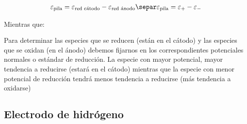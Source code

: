     \begin{gather*}
        \varepsilon_{\text{pila}} = \varepsilon_{\text{red cátodo}} - \varepsilon_{\text{red ánodo} } \separ
        \varepsilon_{\text{pila}}  = \varepsilon_+ - \varepsilon_-
    \end{gather*}









    Mientras que:


    Para determinar las especies que se reducen (están en el cátodo) y las especies que se oxidan (en el ánodo) debemos fijarnos en los correspondientes potenciales normales o estándar de reducción.
    La especie con mayor potencial, mayor tendencia a reducirse (estará en el cátodo) mientras que la especie con menor potencial de reducción tendrá menos tendencia a reducirse (más tendencia a oxidarse)

    \subsection{Electrodo de hidrógeno}\label{subsec:electrodo-de-hidrogeno}

